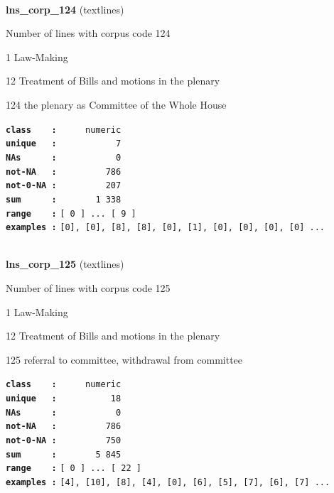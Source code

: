 \documentclass[]{article}
\begin{document}
~

\textbf{lns\_corp\_124} (textlines)

Number of lines with corpus code 124

1 Law-Making

12 Treatment of Bills and motions in the plenary

124 the plenary as Committee of the Whole House

\textbf{\texttt{class\ \ \ \ :}} \texttt{~~~~~numeric}\\
\textbf{\texttt{unique\ \ \ :}} \texttt{~~~~~~~~~~~7}\\
\textbf{\texttt{NAs\ \ \ \ \ \ :}} \texttt{~~~~~~~~~~~0}\\
\textbf{\texttt{not-NA\ \ \ :}} \texttt{~~~~~~~~~786}\\
\textbf{\texttt{not-0-NA\ :}} \texttt{~~~~~~~~~207}\\
\textbf{\texttt{sum\ \ \ \ \ \ :}} \texttt{~~~~~~~1~338}\\
\textbf{\texttt{range\ \ \ \ :}}
\texttt{{[}\ 0\ {]}\ ...\ {[}\ 9\ {]}}\\
\textbf{\texttt{examples\ :}}
\texttt{{[}0{]},\ {[}0{]},\ {[}8{]},\ {[}8{]},\ {[}0{]},\ {[}1{]},\ {[}0{]},\ {[}0{]},\ {[}0{]},\ {[}0{]}\ ...}\\

~

\textbf{lns\_corp\_125} (textlines)

Number of lines with corpus code 125

1 Law-Making

12 Treatment of Bills and motions in the plenary

125 referral to committee, withdrawal from committee

\textbf{\texttt{class\ \ \ \ :}} \texttt{~~~~~numeric}\\
\textbf{\texttt{unique\ \ \ :}} \texttt{~~~~~~~~~~18}\\
\textbf{\texttt{NAs\ \ \ \ \ \ :}} \texttt{~~~~~~~~~~~0}\\
\textbf{\texttt{not-NA\ \ \ :}} \texttt{~~~~~~~~~786}\\
\textbf{\texttt{not-0-NA\ :}} \texttt{~~~~~~~~~750}\\
\textbf{\texttt{sum\ \ \ \ \ \ :}} \texttt{~~~~~~~5~845}\\
\textbf{\texttt{range\ \ \ \ :}}
\texttt{{[}\ 0\ {]}\ ...\ {[}\ 22\ {]}}\\
\textbf{\texttt{examples\ :}}
\texttt{{[}4{]},\ {[}10{]},\ {[}8{]},\ {[}4{]},\ {[}0{]},\ {[}6{]},\ {[}5{]},\ {[}7{]},\ {[}6{]},\ {[}7{]}\ ...}\\
\end{document}
